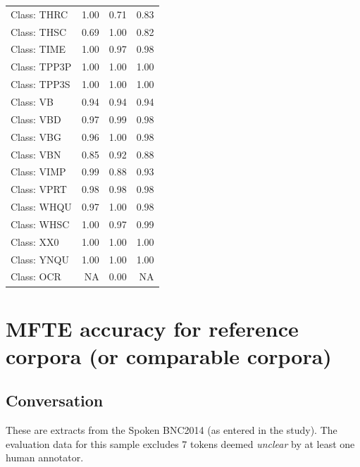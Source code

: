 \documentclass[
  letterpaper,
  DIV=11,
  numbers=noendperiod]{scrreprt}
\begin{document}
\begin{longtable}[]{@{}lrrr@{}}
Class: THRC & 1.00 & 0.71 & 0.83 \\
Class: THSC & 0.69 & 1.00 & 0.82 \\
Class: TIME & 1.00 & 0.97 & 0.98 \\
Class: TPP3P & 1.00 & 1.00 & 1.00 \\
Class: TPP3S & 1.00 & 1.00 & 1.00 \\
Class: VB & 0.94 & 0.94 & 0.94 \\
Class: VBD & 0.97 & 0.99 & 0.98 \\
Class: VBG & 0.96 & 1.00 & 0.98 \\
Class: VBN & 0.85 & 0.92 & 0.88 \\
Class: VIMP & 0.99 & 0.88 & 0.93 \\
Class: VPRT & 0.98 & 0.98 & 0.98 \\
Class: WHQU & 0.97 & 1.00 & 0.98 \\
Class: WHSC & 1.00 & 0.97 & 0.99 \\
Class: XX0 & 1.00 & 1.00 & 1.00 \\
Class: YNQU & 1.00 & 1.00 & 1.00 \\
Class: OCR & NA & 0.00 & NA \\
\end{longtable}

\section{MFTE accuracy for reference corpora (or comparable
corpora)}\label{mfte-accuracy-for-reference-corpora-or-comparable-corpora}

\subsection{Conversation}\label{conversation}

These are extracts from the Spoken BNC2014 (as entered in the study).
The evaluation data for this sample excludes 7 tokens deemed
\emph{unclear} by at least one human annotator.
\end{document}
